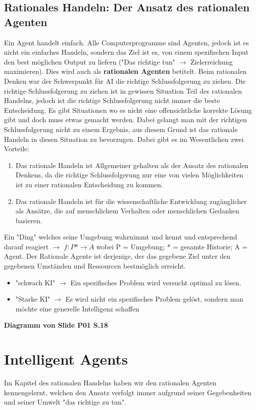 \documentclass{article}
\theoremstyle{merke}
\theoremstyle{definition}
\begin{document}
 \subsection{Rationales Handeln: Der Ansatz des rationalen Agenten}
 Ein Agent handelt einfach. Alle Computerprogramme sind Agenten, jedoch ist es nicht ein einfaches Handeln, sondern das Ziel ist es, von einem spezifischen Input den best möglichen Output zu liefern ("Das richtige tun" $\rightarrow$ Zielerreichung maximieren). Dies wird auch als \textbf{rationalen Agenten} betitelt. Beim rationalen Denken war der Schwerpunkt für AI die richtige Schlussfolgerung zu ziehen. Die richtige Schlussfolgerung zu ziehen ist in gewissen Situation Teil des rationalen Handelns, jedoch ist die richtige Schlussfolgerung nicht immer die beste Entscheidung. Es gibt Situationen wo es nicht eine offensichtliche korrekte Lösung gibt und doch muss etwas gemacht werden. Dabei gelangt man mit der richtigen Schlussfolgerung nicht zu einem Ergebnis, aus diesem Grund ist das rationale Handeln in diesen Situation zu bevorzugen. Dabei gibt es im Wesentlichen zwei Vorteile:
 \begin{enumerate}
 	\item Das rationale Handeln ist Allgemeiner gehalten als der Ansatz des rationalen Denkens, da die richtige Schlussfolgerung nur eine von vielen Möglichkeiten ist zu einer rationalen Entscheidung zu kommen. 
 	\item Das rationale Handeln ist für die wissenschaftliche Entwicklung zugänglicher als Ansätze, die auf menschlichem Verhalten oder menschlichen Gedanken basieren.
 \end{enumerate}
Ein "Ding" welches seine Umgebung wahrnimmt und kennt und entsprechend darauf reagiert $\rightarrow$ $f:P* \rightarrow A$ wobei P = Umgebung; * = gesamte Historie; A = Agent.
Der Rationale Agente ist derjenige, der das gegebene Ziel unter den gegebenen Umständen und Ressourcen bestmöglich erreicht.
\begin{itemize}
\item "schwach KI" $\rightarrow$ Ein spezifisches Problem wird versucht optimal zu lösen.
\item "Starke KI" $\rightarrow$ Es wird nicht ein spezifisches Problem gelöst, sondern man möchte eine generelle Intelligenz schaffen
\end{itemize}
\textbf{Diagramm von Slide P01 S.18}


\section{Intelligent Agents}
Im Kapitel des rationalen Handelns haben wir den rationalen Agenten kennengelernt, welchen den Ansatz verfolgt immer aufgrund seiner Gegebenheiten und seiner Umwelt "das richtige zu tun".
\end{document}
